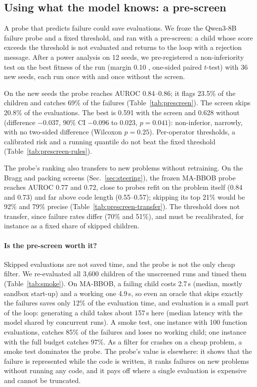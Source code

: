 \subsection{Using what the model knows: a pre-screen}
A probe that predicts failure could save evaluations. We froze the
Qwen3-8B failure probe and a fixed threshold, and ran \llamea with a
pre-screen: a child whose score exceeds the threshold is not evaluated
and returns to the loop with a rejection message. After a power
analysis on 12 seeds, we pre-registered a non-inferiority test on the
best fitness of the run (margin 0.10 \aocc, one-sided paired $t$-test)
with 36 new seeds, each run once with and once without the screen.

On the new seeds the probe reaches AUROC 0.84--0.86; it flags 23.5\% of
the children and catches 69\% of the failures (Table~\ref{tab:prescreen}).
The screen skips 20.8\% of the evaluations. The best \aocc is 0.591 with
the screen and 0.628 without (difference $-0.037$, 90\% CI $-0.096$ to
$0.023$, $p=0.041$): non-inferior, narrowly, with no two-sided
difference (Wilcoxon $p=0.25$). Per-operator thresholds, a calibrated
risk and a running quantile do not beat the fixed threshold
(Table~\ref{tab:prescreen-rules}).

The probe's ranking also transfers to new problems without retraining.
On the Bragg and packing screens (Sec.~\ref{sec:steering}), the frozen
MA-BBOB probe reaches AUROC 0.77 and 0.72, close to probes refit on the
problem itself (0.84 and 0.73) and far above code length (0.55--0.57);
skipping its top 21\% would be 92\% and 79\% precise
(Table~\ref{tab:prescreen-transfer}). The threshold does not transfer,
since failure rates differ (70\% and 51\%), and must be recalibrated, for
instance as a fixed share of skipped children.

\paragraph{Is the pre-screen worth it?}
Skipped evaluations are not saved time, and the probe is not the only
cheap filter. We re-evaluated all 3,600 children of the unscreened runs
and timed them (Table~\ref{tab:smoke}). On MA-BBOB, a failing child
costs 2.7\,s (median, mostly sandbox start-up) and a working one
4.9\,s, so even an oracle that skips exactly the failures saves only
12\% of the evaluation time, and evaluation is a small part of the
loop: generating a child takes about 157\,s here (median latency with
the model shared by concurrent runs). A smoke test, one instance with
100 function evaluations, catches 85\% of the failures and loses no
working child; one instance with the full budget catches 97\%. As a
filter for crashes on a cheap problem, a smoke test dominates the
probe. The probe's value is elsewhere: it shows that the failure is
represented while the code is written, it ranks failures on new
problems without running any code, and it pays off where a single
evaluation is expensive and cannot be truncated.

